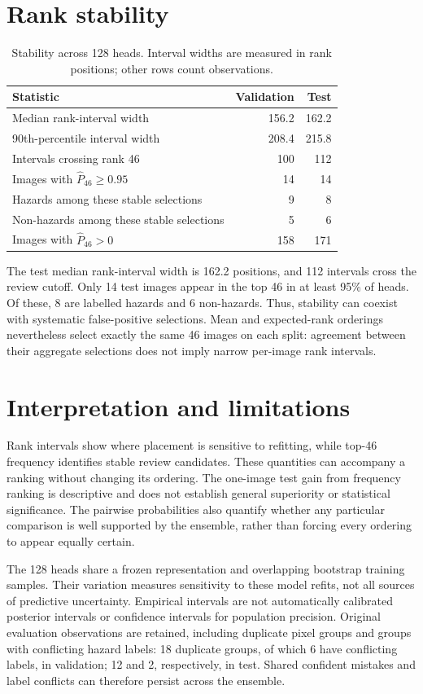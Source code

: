 \documentclass[10pt,a4paper]{article}
\begin{document}
\section{Rank stability}
\begin{table}[H]
\centering
\caption{Stability across 128 heads. Interval widths are measured in rank positions; other rows count observations.}
\label{tab:stability}
\small
\begin{tabular}{lrr}
\toprule
Statistic & Validation & Test \\
\midrule
Median rank-interval width & 156.2 & 162.2 \\
90th-percentile interval width & 208.4 & 215.8 \\
Intervals crossing rank 46 & 100 & 112 \\
Images with $\widehat{P}_{46}\geq0.95$ & 14 & 14 \\
Hazards among these stable selections & 9 & 8 \\
Non-hazards among these stable selections & 5 & 6 \\
Images with $\widehat{P}_{46}>0$ & 158 & 171 \\
\bottomrule
\end{tabular}
\end{table}

The test median rank-interval width is 162.2 positions, and 112 intervals cross
the review cutoff. Only 14 test images appear in the top 46 in at least 95\% of
heads. Of these, 8 are labelled hazards and 6 non-hazards. Thus, stability can
coexist with systematic false-positive selections. Mean and expected-rank
orderings nevertheless select exactly the same 46 images on each split: agreement
between their aggregate selections does not imply narrow per-image rank intervals.

\section{Interpretation and limitations}
Rank intervals show where placement is sensitive to refitting, while top-46
frequency identifies stable review candidates. These quantities can accompany a
ranking without changing its ordering. The one-image test gain from frequency
ranking is descriptive and does not establish general superiority or statistical
significance. The pairwise probabilities also quantify whether any particular
comparison is well supported by the ensemble, rather than forcing every ordering
to appear equally certain.

The 128 heads share a frozen representation and overlapping bootstrap training
samples. Their variation measures sensitivity to these model refits, not all
sources of predictive uncertainty. Empirical intervals are not automatically
calibrated posterior intervals or confidence intervals for population precision.
Original evaluation observations are retained, including duplicate pixel groups
and groups with conflicting hazard labels: 18 duplicate groups, of which 6 have
conflicting labels, in validation; 12 and 2, respectively, in test. Shared confident
mistakes and label conflicts can therefore persist across the ensemble.
\end{document}
